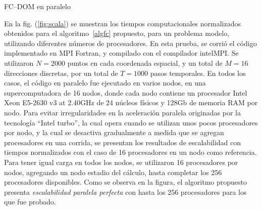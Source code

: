 \begin{algorithm}
\caption{FC--DOM en paralelo}\label{algfc}
\end{algorithm}


En la fig. (\ref{fig:scala}) se muestran los tiempos computacionales 
normalizados obtenidos 
para el algoritmo~\eqref{algfc} propuesto, para un 
problema modelo, utilizando diferentes números de procesadores. 
En esta prueba, se corrió el código implementado en MPI Fortran, 
y compilado con el compilador intelMPI. Se utilizaron $N=2000$ 
puntos en cada coordenada espacial, y un total de $M=16$ direcciones 
discretas, por un total de $T=1000$ pasos temporales.  
En todos los casos, el código en paralelo 
fue ejecutado en varios nodos, en una supercomputadora 
de 16 nodos, donde cada nodo contiene un procesador
Intel Xeon E5-2630 v3 at 2.40GHz de 24 núcleos físicos 
y 128Gb de memoria RAM por nodo. 
Para evitar irregularidades en la aceleración paralela 
originadas por la tecnología ``Intel turbo'', la cual 
opera cuando se utilizan unos pocos procesadores por nodo, 
y la cual se desactiva gradualmente a medida que se agregan procesadores 
en una corrida, se presentan los resultados de escalabilidad 
con tiempos normalizados con el caso de 16 procesadores 
en un nodo como referencia. Para tener igual carga en todos los nodos, 
se utilizaron 16 procesadores por nodos, agregando un nodo 
estadio del cálculo, hasta completar los 256 procesadores disponibles. 
Como se observa en la figura, el algoritmo propuesto 
presenta \textit{escalabilidad paralela perfecta} 
con hasta los 256 procesadores para los que fue probado.


